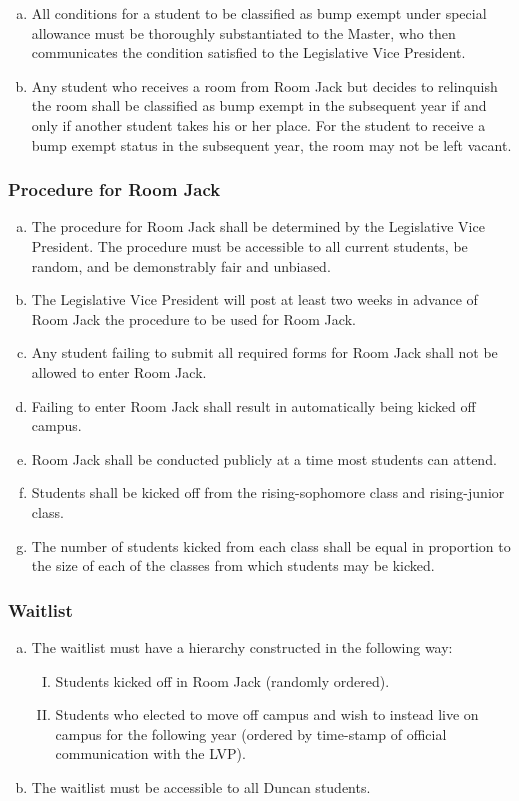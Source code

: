 \documentclass[USletter,12pt]{article}
\begin{document}
\begin{enumerate}[(a)]
\begin{enumerate}[(I)]
	\end{enumerate}
\item All conditions for a student to be classified as bump exempt under special allowance must be thoroughly substantiated to the Master, who then communicates the condition satisfied to the Legislative Vice President.
\item Any student who receives a room from Room Jack but decides to relinquish the room shall be classified as bump exempt in the subsequent year if and only if another student takes his or her place.  For the student to receive a bump exempt status in the subsequent year, the room may not be left vacant.
\end{enumerate}

\subsubsection{Procedure for Room Jack}
\begin{enumerate}[(a)]
\item The procedure for Room Jack shall be determined by the Legislative Vice President.  The procedure must be accessible to all current students, be random, and be demonstrably fair and unbiased.
\item The Legislative Vice President will post at least two weeks in advance of Room Jack the procedure to be used for Room Jack.
\item Any student failing to submit all required forms for Room Jack shall not be allowed to enter Room Jack.
\item Failing to enter Room Jack shall result in automatically being kicked off campus.
\item Room Jack shall be conducted publicly at a time most students can attend.
\item Students shall be kicked off from the rising-sophomore class and rising-junior class.
\item The number of students kicked from each class shall be equal in proportion to the size of each of the classes from which students may be kicked.
\end{enumerate}

\subsubsection{Waitlist}
\begin{enumerate}[(a)]
\item The waitlist must have a hierarchy constructed in the following way:
	\begin{enumerate}[(I)]
	\item Students kicked off in Room Jack (randomly ordered).
	\item Students who elected to move off campus and wish to instead live on campus for the following year (ordered by time-stamp of official communication with the LVP).
	\end{enumerate}
\item  The waitlist must be accessible to all Duncan students.
\end{enumerate}
\end{document}
